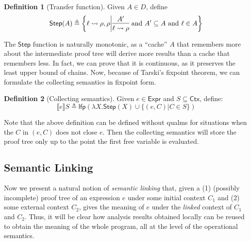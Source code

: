 \documentclass[acmsmall,review]{acmart}\settopmatter{printfolios=true,printccs=false,printacmref=false}
\theoremstyle{definition}
\newtheorem{defn}{Definition}[section]
\theoremstyle{plain}
\newcommand*{\Expr}{\mathsf{Expr}}
\newcommand*{\Ctx}{\mathsf{Ctx}}
\newcommand*{\lfp}{\mathsf{lfp}}
\newcommand*{\semarrow}{\rightsquigarrow}
\newcommand*{\sembracket}[1]{\lBrack{#1}\rBrack}
\begin{document}
\begin{defn}[Transfer function]
  Given $A\in D$, define
  \[
    \mathsf{Step}(A)\triangleq
    \left\{\ell\semarrow\rho, \rho\middle|
    \begin{prooftree}[center=true]
      \hypo{A'}\infer1{\ell\semarrow\rho}
    \end{prooftree}\text{ and }
    A'\subseteq A\text{ and }\ell\in A
    \right\}
  \]
\end{defn}

The $\mathsf{Step}$ function is naturally monotonic, as a ``cache'' $A$ that remembers more about the intermediate proof tree will derive more results than a cache that remembers less.
In fact, we can prove that it is continuous, as it preserves the least upper bound of chains.
Now, because of Tarski's fixpoint theorem, we can formulate the collecting semantics in fixpoint form.
\begin{defn}[Collecting semantics]
  Given $e\in\Expr$ and $S\subseteq\Ctx$, define:
  \[
    \sembracket{e}S\triangleq\lfp(\lambda X.\mathsf{Step}(X)\cup\{(e,C)|C\in S\})
  \]
\end{defn}
Note that the above definition can be defined without qualms for situations when the $C$ in $(e,C)$ does not close $e$.
Then the collecting semantics will store the proof tree only up to the point the first free variable is evaluated.

\subsection{Semantic Linking}
Now we present a natural notion of \emph{semantic linking} that, given a (1) (possibly incomplete) proof tree of an expression $e$ under some initial context $C_1$ and (2) some external context $C_2$, gives the meaning of $e$ under the \emph{linked} context of $C_1$ and $C_2$.
Thus, it will be clear how analysis results obtained locally can be reused to obtain the meaning of the whole program, all at the level of the operational semantics.
\end{document}
